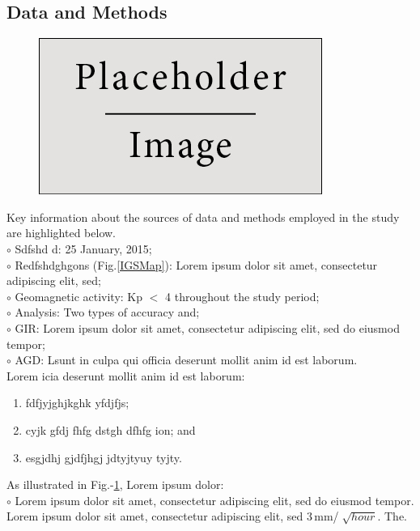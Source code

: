 \documentclass[a0,portrait]{a0poster}
\begin{document}
\begin{minipage}[c]{\linewidth}
\begin{framed}
\begin{multicols}{2}
\section*{Data and Methods}
\begin{figure}
\centering
\includegraphics[scale=0.5]{figures/placeholder}
\label{STECchart}
\end{figure}
Key information about the sources of data and methods employed in the study are highlighted below.\\
\hspace{0.1cm}$\circ$ Sdfshd d: 25 January, 2015;\\
\hspace{0.1cm}$\circ$ Redfshdghgons (Fig.\ref{IGSMap}): Lorem ipsum dolor sit amet, consectetur adipiscing elit, sed;\\
\hspace{0.1cm}$\circ$ Geomagnetic activity: Kp $<$ 4 throughout the study period;\\
\hspace{0.1cm}$\circ$ Analysis: Two types of accuracy and;\\
\hspace{0.1cm}$\circ$ GIR: Lorem ipsum dolor sit amet, consectetur adipiscing elit, sed do eiusmod tempor;\\
\hspace{0.1cm}$\circ$ AGD: Lsunt in culpa qui officia deserunt mollit anim id est laborum.\\
Lorem icia deserunt mollit anim id est laborum:
\begin{enumerate}
\item fdfjyjghjkghk yfdjfjs;
\item cyjk gfdj fhfg dstgh dfhfg ion; and
\item esgjdhj gjdfjhgj jdtyjtyuy  tyjty.
\end{enumerate}
As illustrated in Fig.-\ref{STECchart}, Lorem ipsum dolor:\\
\hspace{0.1cm}$\circ$ Lorem ipsum dolor sit amet, consectetur adipiscing elit, sed do eiusmod tempor.\\
Lorem ipsum dolor sit amet, consectetur adipiscing elit, sed  3\,mm/$\sqrt[]{hour}$. The.
\color{Black}

\end{multicols}
\end{framed}
\end{minipage}
\end{document}
